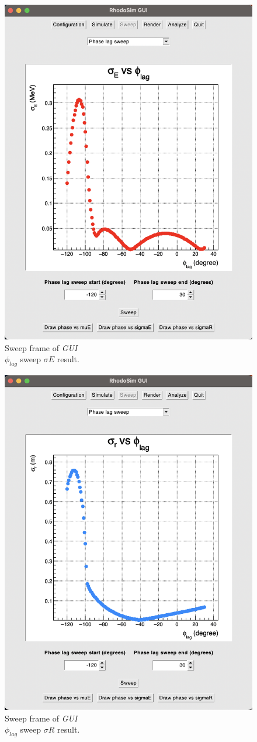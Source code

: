 \documentclass[a4paper,oneside,12pt]{report}
\numberwithin{equation}{chapter}
\begin{document}
\begin{figure}
    \centering
    \includegraphics[width=0.8\linewidth]{./figures/rhodoSim/GUI_sweep_sE.png}
    \caption{Sweep frame of \textit{GUI} \\ $\phi_{lag}$ sweep $\sigma E$ result.}
    \label{fig:gui_sweep_sE}
\end{figure}
\begin{figure}
    \centering
    \includegraphics[width=0.8\linewidth]{./figures/rhodoSim/GUI_sweep_sR.png}
    \caption{Sweep frame of \textit{GUI} \\ $\phi_{lag}$ sweep $\sigma R$ result.}
    \label{fig:gui_sweep_sR}
\end{figure}
\end{document}

